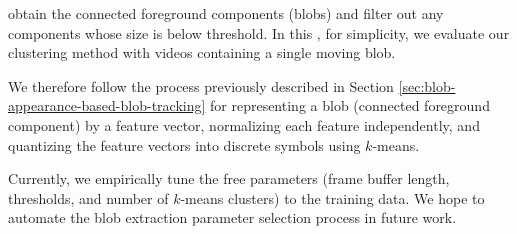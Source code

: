 \DIFaddend obtain the connected
foreground components (blobs) and filter out any components whose size
is below threshold. In this \DIFdelbegin {}\DIFdelend \DIFaddbegin {}\DIFaddend , for simplicity, we evaluate our
clustering method with videos containing a single moving blob. \DIFaddbegin {}\DIFaddend 

We therefore follow the process previously described in
Section \ref{sec:blob-appearance-based-blob-tracking} for representing
a blob (connected foreground component) by a feature vector,
normalizing each feature independently, and quantizing the feature
vectors into discrete symbols using $k$-means.



Currently, we empirically tune the free parameters (frame buffer
length, thresholds, and number of $k$-means clusters) to the training
data. We hope to automate the blob extraction parameter selection
process in future work.

